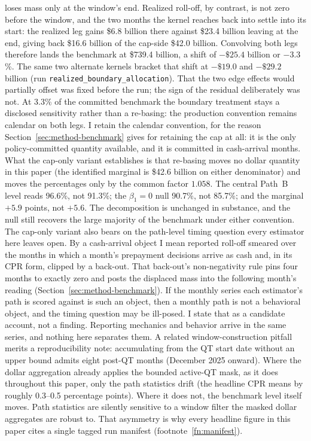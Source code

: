 \documentclass[12pt]{article}
\begin{document}
loses mass only at the window's end. Realized roll-off, by contrast, is not zero before the window, and the two months the kernel reaches back into settle into its start: the realized leg gains \$6.8 billion there against \$23.4 billion leaving at the end, giving back \$16.6 billion of the cap-side \$42.0 billion. Convolving both legs therefore lands the benchmark at \$739.4 billion, a shift of $-\$25.4$ billion or $-3.3$\%. The same two alternate kernels bracket that shift at $-\$19.0$ and $-\$29.2$ billion (run \texttt{realized\_boundary\_allocation}). That the two edge effects would partially offset was fixed before the run; the sign of the residual deliberately was not. At 3.3\% of the committed benchmark the boundary treatment stays a disclosed sensitivity rather than a re-basing: the production convention remains calendar on both legs. I retain the calendar convention, for the reason Section~\ref{sec:method-benchmark} gives for retaining the cap at all: it is the only policy-committed quantity available, and it is committed in cash-arrival months. What the cap-only variant establishes is that re-basing moves no dollar quantity in this paper (the identified marginal is \$42.6 billion on either denominator) and moves the percentages only by the common factor $1.058$. The central Path~B level reads 96.6\%, not 91.3\%; the $\beta_1 = 0$ null 90.7\%, not 85.7\%; and the marginal $+5.9$ points, not $+5.6$. The decomposition is unchanged in substance, and the null still recovers the large majority of the benchmark under either convention. The cap-only variant also bears on the path-level timing question every estimator here leaves open. By a cash-arrival object I mean reported roll-off smeared over the months in which a month's prepayment decisions arrive as cash and, in its CPR form, clipped by a back-out. That back-out's non-negativity rule pins four months to exactly zero and posts the displaced mass into the following month's reading (Section~\ref{sec:method-benchmark}). If the monthly series each estimator's path is scored against is such an object, then a monthly path is not a behavioral object, and the timing question may be ill-posed. I state that as a candidate account, not a finding. Reporting mechanics and behavior arrive in the same series, and nothing here separates them. A related window-construction pitfall merits a reproducibility note: accumulating from the QT start date without an upper bound admits eight post-QT months (December 2025 onward). Where the dollar aggregation already applies the bounded active-QT mask, as it does throughout this paper, only the path statistics drift (the headline CPR means by roughly 0.3--0.5 percentage points). Where it does not, the benchmark level itself moves. Path statistics are silently sensitive to a window filter the masked dollar aggregates are robust to. That asymmetry is why every headline figure in this paper cites a single tagged run manifest (footnote~\ref{fn:manifest}).
\end{document}
